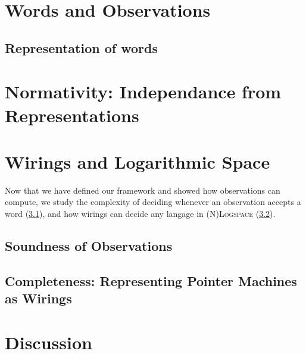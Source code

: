 \section{Words and Observations}\label{sec_words}
	\subsection{Representation of words}
	
	
	
\section{Normativity: Independance from Representations}\label{sec_normativity}
	

\section{Wirings and Logarithmic Space}\label{sec_logspace}
	Now that we have defined our framework and showed how observations can compute, we study the complexity of deciding whenever an observation accepts a word (\ref{subsec_soundness}), and how wirings can decide any langage in \textsc{(N)Logspace} (\ref{subsec_completness}).
	\subsection{Soundness of Observations}
	\label{subsec_soundness}
	
	\subsection{Completeness: Representing Pointer Machines as Wirings}
	\label{subsec_completness}
	

\section*{Discussion}






